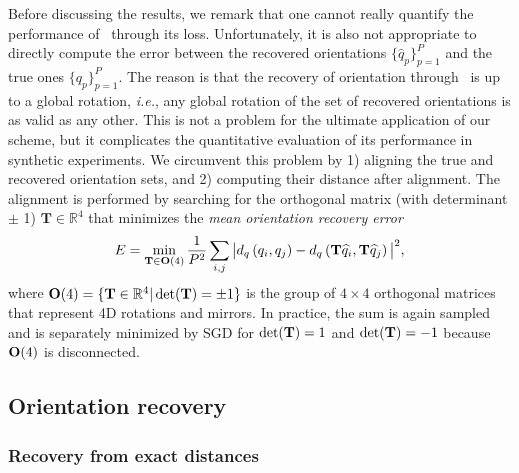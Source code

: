 Before discussing the results, we remark that one cannot really quantify the performance of~ through its loss. Unfortunately, it is also not appropriate to directly compute the error between the recovered orientations $\big\{\widehat{q}_p\big\}_{p=1}^P$ and the true ones $\big\{q_p\big\}_{p=1}^P$. The reason is that the recovery of orientation through~ is up to a global rotation, \textit{i.e.}, any global rotation of the set of recovered orientations is as valid as any other. This is not a problem for the ultimate application of our scheme, but it complicates the quantitative evaluation of its performance in synthetic experiments. We circumvent this problem by 1) aligning the true and recovered orientation sets, and 2) computing their distance after alignment.
The alignment is performed by searching for the orthogonal matrix (with determinant $\pm$ 1) $\mathbf{T}\in\mathbb{R}^4$  that minimizes
 the \textit{mean orientation recovery error}
\begin{equation}
    E = \min_{\mathbf{T} \in \mathrm{\mathbf{O}}(4)} \frac{1}{P^2} \sum_{i,j} \big| d_q\left(q_i,q_j\right)- d_q\left(\mathbf{T}\widehat{q}_i,\mathbf{T}\widehat{q}_j\right) \big|^2,
    \label{eqn:orientation-recovery-error}
\end{equation}
where $\mathrm{\mathbf{O}}(4) = \{\mathbf{T} \in \mathbb{R}^4 | \det(\mathbf{T}) = \pm 1\}$ is the group of $4 \times 4$ orthogonal matrices that represent 4D rotations and mirrors.
In practice, the sum is again sampled and  is separately minimized by SGD for $\det(\mathbf{T}) = 1$ and $\det(\mathbf{T}) = -1$ because $\mathrm{\mathbf{O}}(4)$ is disconnected.

\subsection{Orientation recovery}\label{sec:results:orientation-recovery}


\subsubsection{Recovery from exact distances}\label{sec:results:orientation-recovery:exact}

